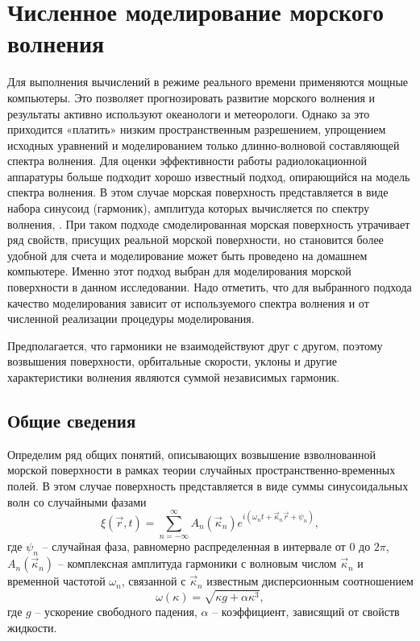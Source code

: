 \newcommand{\tK}{\widetilde K}
\section{Численное моделирование морского волнения}

Для выполнения вычислений в режиме реального времени применяются
мощные компьютеры. Это позволяет прогнозировать развитие морского волнения и
результаты активно используют океанологи и метеорологи. Однако за это
приходится «платить» низким пространственным разрешением, упрощением исходных
уравнений и моделированием только длинно-волновой составляющей спектра
волнения.  Для оценки эффективности работы радиолокационной аппаратуры больше
подходит хорошо известный подход, опирающийся на модель спектра волнения. В
этом случае морская поверхность представляется в виде набора синусоид
(гармоник), амплитуда которых вычисляется по спектру
волнения\cite{longe-higgins}, \cite{karaev}. При
таком подходе смоделированная морская поверхность утрачивает ряд свойств,
присущих реальной морской поверхности, но становится более удобной для счета и
моделирование может быть проведено на домашнем компьютере. Именно
этот подход выбран для моделирования морской поверхности в данном исследовании.
Надо отметить, что для выбранного подхода качество моделирования зависит от
используемого спектра волнения и от численной реализации процедуры
моделирования.

Предполагается, что гармоники не взаимодействуют друг с другом, поэтому возвышения поверхности, орбитальные
скорости, уклоны и другие характеристики волнения являются суммой
независимых гармоник.

\subsection{Общие сведения}%
\label{sec:obshchie_poniatiia}
Определим ряд общих понятий, описывающих возвышение взволнованной морской поверхности в рамках теории случайных пространственно-временных полей. В этом случае поверхность представляется в виде суммы синусоидальных волн со случайными фазами 
\begin{equation}
    \label{eq:surface}
    \xi(\vec r,t) = \sum\limits_{n=-\infty}^{\infty} 
        A_n(\vec \kappa_n) e^{i(\omega_n t + \vec \kappa_n \vec r + \psi_n)},
\end{equation}
где $\psi_n$ -- случайная фаза,
равномерно распределенная в интервале от $0$ до  $2 \pi$, 
$A_n (\vec \kappa_n)$ -- комплексная амплитуда гармоники с волновым числом
$\vec \kappa_n$ и временной частотой  $\omega_n$, связанной с  $\vec \kappa_n$ известным
дисперсионным соотношением
\begin{equation}
    \omega(\kappa) = \sqrt{\kappa g + \alpha \kappa^3},
\end{equation}
где $g$ -- ускорение свободного падения,  $\alpha$ -- коэффициент, 
зависящий от свойств жидкости.



